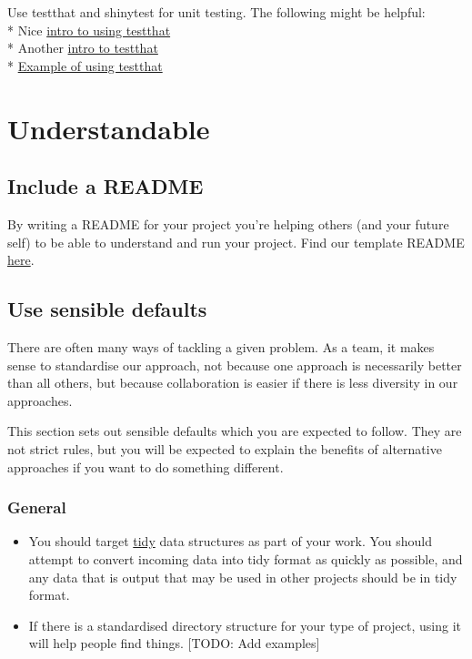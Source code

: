 \documentclass[]{book}
\providecommand{\tightlist}{%
  \setlength{\itemsep}{0pt}\setlength{\parskip}{0pt}}
\begin{document}
Use testthat and shinytest for unit testing. The following might be helpful:\\
* Nice \href{https://katherinemwood.github.io/post/testthat/}{intro to using testthat}\\
* Another \href{https://towardsdatascience.com/unit-testing-in-r-68ab9cc8d211}{intro to testthat}\\
* \href{https://github.com/RobinL/costmodelr/tree/master/tests}{Example of using testthat}

\hypertarget{understand}{%
\section{Understandable}\label{understand}}

\hypertarget{readme}{%
\subsection{Include a README}\label{readme}}

By writing a README for your project you're helping others (and your future self) to be able to understand and run your project. Find our template README \href{https://github.com/moj-analytical-services/our-coding-standards/blob/master/README_template.md}{here}.

\hypertarget{defaults}{%
\subsection{Use sensible defaults}\label{defaults}}

There are often many ways of tackling a given problem. As a team, it makes sense to standardise our approach, not because one approach is necessarily better than all others, but because collaboration is easier if there is less diversity in our approaches.

This section sets out sensible defaults which you are expected to follow. They are not strict rules, but you will be expected to explain the benefits of alternative approaches if you want to do something different.

\hypertarget{general}{%
\subsubsection*{General}\label{general}}

\begin{itemize}
\tightlist
\item
  You should target \href{http://vita.had.co.nz/papers/tidy-data.html}{tidy} data structures as part of your work. You should attempt to convert incoming data into tidy format as quickly as possible, and any data that is output that may be used in other projects should be in tidy format.
\item
  If there is a standardised directory structure for your type of project, using it will help people find things. {[}TODO: Add examples{]}
\end{itemize}
\end{document}

